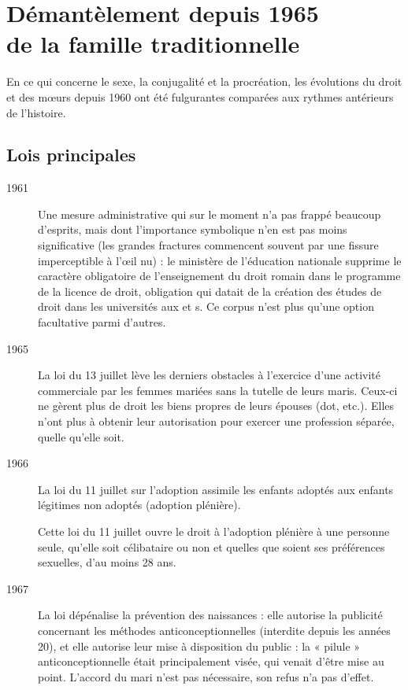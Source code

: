 
\chapter[Démantèlement depuis 1965 de la famille traditionnelle]{Démantèlement depuis 1965\\de la famille traditionnelle}


 En ce qui concerne le sexe, la conjugalité et la procréation, les évolutions du droit et des mœurs depuis 1960 ont été fulgurantes comparées aux rythmes antérieurs de l'histoire.


\section{Lois principales}

\begin{description}

\item[1961] Une mesure administrative qui sur le moment n'a pas frappé beaucoup d'esprits, mais dont l'importance symbolique n'en est pas moins significative (les grandes fractures commencent souvent par une fissure imperceptible à l'œil nu) : le ministère de l'éducation nationale supprime le caractère obligatoire de l'enseignement du droit romain dans le programme de la licence de droit, obligation qui datait de la création des études de droit dans les universités aux  et s. Ce corpus n'est plus qu'une option facultative parmi d'autres. 

\item[1965] La loi du 13 juillet lève les derniers obstacles à l'exercice d'une activité commerciale par les femmes mariées sans la tutelle de leurs maris. Ceux-ci ne gèrent plus de droit les biens propres de leurs épouses (dot, etc.). Elles n'ont plus à obtenir leur autorisation pour exercer une profession séparée, quelle qu'elle soit.

\item[1966] La loi du 11 juillet sur l'adoption assimile les enfants adoptés aux enfants légitimes non adoptés (adoption plénière). 

Cette
loi du 11 juillet ouvre le droit à l'adoption plénière à une personne seule, qu'elle soit célibataire ou non et quelles que soient ses préférences sexuelles, d'au moins 28 ans.

\item[1967] La loi  dépénalise la prévention des naissances : elle autorise la publicité concernant les méthodes anticonceptionnelles (interdite depuis les années 20), et elle autorise leur mise à disposition du public :
la « pilule » anticonceptionnelle était principalement visée,
qui venait d'être mise au point. L'accord du mari n'est pas nécessaire, son refus n'a pas d'effet.


\end{description}
